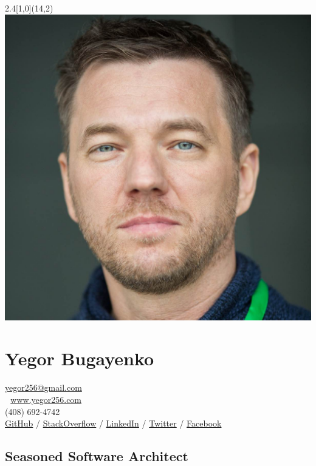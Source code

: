 \documentclass[12pt]{article}
\begin{document}
\setlength{\topskip}{0mm}
\setlength{\parindent}{0pt}
\setlength{\parskip}{4pt}
\raggedright
{}

\begin{textblock}{2.4}[1,0](14,2){
  \includegraphics[width=\textwidth]{../images/face-1200x1200.jpg}
}\end{textblock}

\section*{Yegor Bugayenko}

\href{mailto:yegor256@gmail.com}{yegor256@gmail.com}\\ %
\href{https://www.yegor256.com}{www.yegor256.com}\\%
(408) 692-4742\\%
\href{https://github.com/yegor256}{GitHub} /
\href{https://stackexchange.com/users/63162/yegor256}{StackOverflow} /
\href{https://www.linkedin.com/in/yegor256}{LinkedIn} /
\href{https://twitter.com/intent/follow?screen_name=yegor256}{Twitter} /
\href{https://www.facebook.com/yegor256}{Facebook}

\subsection*{Seasoned Software Architect}
\end{document}
